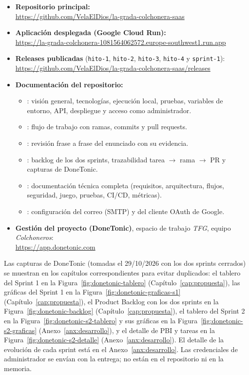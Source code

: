 \begin{sloppypar}
\setlength{\emergencystretch}{5em}
\begin{itemize}
    \item \textbf{Repositorio principal:}\\
    \url{https://github.com/VelaElDios/la-grada-colchonera-saas}
    \item \textbf{Aplicación desplegada (Google Cloud Run):}\\
    \url{https://la-grada-colchonera-1081564062572.europe-southwest1.run.app}
    \item \textbf{Releases publicadas} (\texttt{hito-1}, \texttt{hito-2}, \texttt{hito-3}, \texttt{hito-4} y \texttt{sprint-1}):\\
    \url{https://github.com/VelaElDios/la-grada-colchonera-saas/releases}
    \item \textbf{Documentación del repositorio:}
    \begin{itemize}
        \item {}: visión general, tecnologías, ejecución local, pruebas, variables de entorno, API, despliegue y acceso como administrador.
        \item {}: flujo de trabajo con ramas, commits y pull requests.
        \item {}: revisión frase a frase del enunciado con su evidencia.
        \item {}: backlog de los dos sprints, trazabilidad tarea $\rightarrow$ rama $\rightarrow$ PR y capturas de DoneTonic.
        \item {}: documentación técnica completa (requisitos, arquitectura, flujos, seguridad, juego, pruebas, CI/CD, métricas).
        \item {}: configuración del correo (SMTP) y del cliente OAuth de Google.
    \end{itemize}
    \item \textbf{Gestión del proyecto (DoneTonic)}, espacio de trabajo \textit{TFG}, equipo \textit{Colchoneros}:\\
    \url{https://app.donetonic.com}
\end{itemize}
\end{sloppypar}

Las capturas de DoneTonic (tomadas el 29/10/2026 con los dos sprints cerrados) se muestran en los capítulos correspondientes para evitar duplicados: el tablero del Sprint 1 en la Figura~\ref{fig:donetonic-tablero} (Capítulo~\ref{cap:propuesta}), las gráficas del Sprint 1 en la Figura~\ref{fig:donetonic-graficas-s1} (Capítulo~\ref{cap:propuesta}), el Product Backlog con los dos sprints en la Figura~\ref{fig:donetonic-backlog} (Capítulo~\ref{cap:propuesta}), el tablero del Sprint 2 en la Figura~\ref{fig:donetonic-s2-tablero} y sus gráficas en la Figura~\ref{fig:donetonic-s2-graficas} (Anexo~\ref{anx:desarrollo}), y el detalle de PBI y tareas en la Figura~\ref{fig:donetonic-s2-detalle} (Anexo~\ref{anx:desarrollo}). El detalle de la evolución de cada sprint está en el Anexo~\ref{anx:desarrollo}. Las credenciales de administrador se envían con la entrega; no están en el repositorio ni en la memoria.
